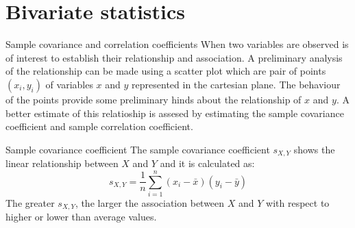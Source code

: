 \documentclass[8pt]{beamer}
\renewcommand{\emph}[1]{\textcolor{myorange}{#1}}
\begin{document}
\section{Bivariate statistics}
\begin{frame}{Sample covariance and correlation coefficients}
    When two variables are observed  is of interest to establish their relationship and association. A preliminary analysis of the relationship can be made using a \emph{scatter plot} which are pair of points $(x_i, y_i)$ of variables $x$ and $y$ represented in the cartesian plane. The behaviour of the points provide some preliminary hinds about the relationship of $x$ and $y$. A better estimate of this relatioship is assesed by estimating the \emph{sample covariance coefficient} and \emph{sample correlation coefficient}.

    \begin{block}{Sample covariance coefficient}
        The sample covariance coefficient $s_{X,Y}$ shows the \emph{linear} relationship between $X$ and $Y$ and it is calculated as:
        $$
        s_{X,Y} = \frac{1}{n} \sum_{i=1}^{n} \left(x_i - \bar{x}\right)\left(y_i - \bar{y}\right)
        $$
        The greater $s_{X,Y}$, the larger the association between $X$ and $Y$ with respect to higher or lower than average values. 
   \end{block}

\end{frame}
\end{document}
